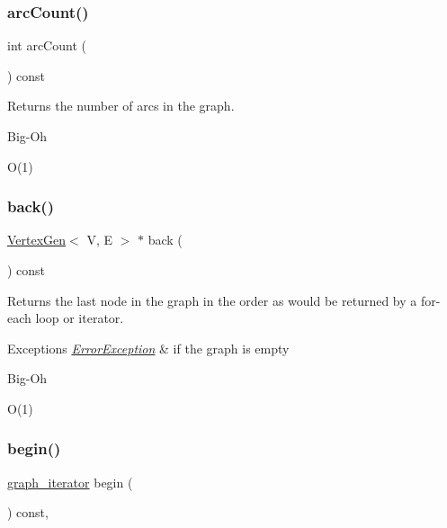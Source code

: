 \subsubsection{\texorpdfstring{arc\+Count()}{arcCount()}}
{\footnotesize\ttfamily int arc\+Count (\begin{DoxyParamCaption}{ }\end{DoxyParamCaption}) const\hspace{0.3cm}{\ttfamily [inherited]}}



Returns the number of arcs in the graph. 

\begin{DoxyRefDesc}{Big-\/\+Oh}
\item[\mbox{\hyperlink{BigOh__BigOh000047}{Big-\/\+Oh}}]O(1) \end{DoxyRefDesc}
\mbox{\label{classGraph_a27d59ef129bb56cc144ecc81c0affd34}} 
\subsubsection{\texorpdfstring{back()}{back()}}
{\footnotesize\ttfamily \mbox{\hyperlink{classVertexGen}{Vertex\+Gen}}$<$ V, E $>$  $\ast$ back (\begin{DoxyParamCaption}{ }\end{DoxyParamCaption}) const\hspace{0.3cm}{\ttfamily [inherited]}}



Returns the last node in the graph in the order as would be returned by a for-\/each loop or iterator. 


\begin{DoxyExceptions}{Exceptions}
{\em \mbox{\hyperlink{classErrorException}{Error\+Exception}}} & if the graph is empty \\
\hline
\end{DoxyExceptions}
\begin{DoxyRefDesc}{Big-\/\+Oh}
\item[\mbox{\hyperlink{BigOh__BigOh000048}{Big-\/\+Oh}}]O(1) \end{DoxyRefDesc}
\mbox{\label{classGraph_aea3a8950c46f4ac913207201b685e715}} 
\subsubsection{\texorpdfstring{begin()}{begin()}}
{\footnotesize\ttfamily \mbox{\hyperlink{classGraph_a695969c31e87f9e8319d74e5ca39024b}{graph\+\_\+iterator}} begin (\begin{DoxyParamCaption}{ }\end{DoxyParamCaption}) const\hspace{0.3cm}{\ttfamily [inline]}, {\ttfamily [inherited]}}



